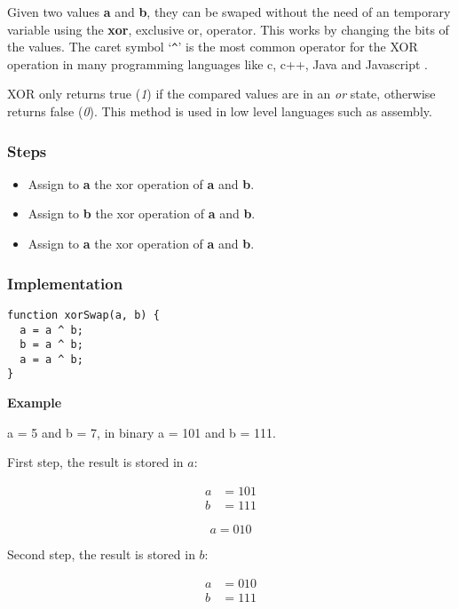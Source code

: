 Given two values \textbf{a} and \textbf{b}, they can be swaped without the need of an temporary variable using the \textbf{xor}, exclusive or, operator. This works by changing the bits of the values. The caret symbol `\verb|^|' is the most common operator for the XOR operation in many programming languages like c, c++, Java and Javascript .

XOR only returns true (\emph{1}) if the compared values are in an \emph{or} state, otherwise returns false (\emph{0}). This method is used in low level languages such as assembly.

\subsubsection*{Steps}

\begin{itemize}
  \item Assign to \textbf{a} the xor operation of \textbf{a} and \textbf{b}.
  \item Assign to \textbf{b} the xor operation of \textbf{a} and \textbf{b}.
  \item Assign to \textbf{a} the xor operation of \textbf{a} and \textbf{b}.
\end{itemize}

\subsubsection*{Implementation}

\begin{lstlisting}[style=general,caption=XOR swap]
function xorSwap(a, b) {
  a = a ^ b;
  b = a ^ b;
  a = a ^ b;
}
\end{lstlisting}

\textbf{Example}

a = 5 and b = 7, in binary a = 101 and b = 111.

First step, the result is stored in $a$:

\begin{align*}
  a &= 101 \\
  b &= 111
\end{align*}

\[\boxed{
  a = 010
}\]

Second step, the result is stored in $b$:

\begin{align*}
  a &= 010 \\
  b &= 111
\end{align*}

